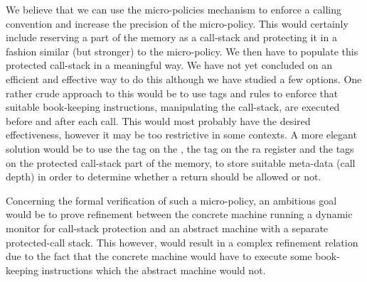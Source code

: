 We believe that we can use the micro-policies mechanism to enforce a
calling convention and increase the precision of the \CFI
micro-policy. This would certainly include reserving a part of the
memory as a call-stack and protecting it in a fashion similar (but
stronger) to the \NWC micro-policy. We then have to populate this
protected call-stack in a meaningful way. We have not yet concluded on
an efficient and effective way to do this although we have studied a
few options. One rather crude approach to this would be to use tags
and rules to enforce that suitable book-keeping instructions,
manipulating the call-stack, are executed before and after each
call. This would most probably have the desired effectiveness, however
it may be too restrictive in some contexts. A more elegant solution
would be to use the tag on the \pc, the tag on the ra register and the
tags on the protected call-stack part of the memory, to store suitable
meta-data (\EG call depth) in order to determine whether a return
should be allowed or not.

Concerning the formal verification of such a micro-policy, an
ambitious goal would be to prove refinement between the concrete
machine running a dynamic monitor for call-stack protection and
an abstract machine with a separate protected-call stack. This however,
would result in a complex refinement relation due to the fact that
the concrete machine would have to execute some book-keeping instructions
which the abstract machine would not.



